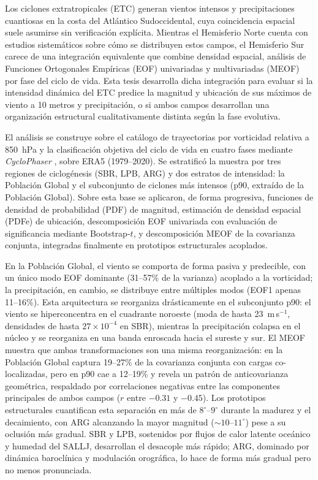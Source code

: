 Los ciclones extratropicales (ETC) generan vientos intensos y precipitaciones cuantiosas en la costa del Atlántico Sudoccidental, cuya coincidencia espacial suele asumirse sin verificación explícita. Mientras el Hemisferio Norte cuenta con estudios sistemáticos sobre cómo se distribuyen estos campos, el Hemisferio Sur carece de una integración equivalente que combine densidad espacial, análisis de Funciones Ortogonales Empíricas (EOF) univariadas y multivariadas (MEOF) por fase del ciclo de vida. Esta tesis desarrolla dicha integración para evaluar si la intensidad dinámica del ETC predice la magnitud y ubicación de sus máximos de viento a 10 metros y precipitación, o si ambos campos desarrollan una organización estructural cualitativamente distinta según la fase evolutiva.

El análisis se construye sobre el catálogo de trayectorias por vorticidad relativa a 850~hPa \citep{gramcianinov2020analysis} y la clasificación objetiva del ciclo de vida en cuatro fases mediante \textit{CycloPhaser} \citep{coutodesouza2024new, deSouza2025CycloPhaser}, sobre ERA5 (1979--2020). Se estratificó la muestra por tres regiones de ciclogénesis (SBR, LPB, ARG) y dos estratos de intensidad: la Población Global y el subconjunto de ciclones más intensos (p90, extraído de la Población Global). Sobre esta base se aplicaron, de forma progresiva, funciones de densidad de probabilidad (PDF) de magnitud, estimación de densidad espacial (PDFe) de ubicación, descomposición EOF univariada con evaluación de significancia mediante Bootstrap-$t$, y descomposición MEOF de la covarianza conjunta, integradas finalmente en prototipos estructurales acoplados.

En la Población Global, el viento se comporta de forma pasiva y predecible, con un único modo EOF dominante (31--57\% de la varianza) acoplado a la vorticidad; la precipitación, en cambio, se distribuye entre múltiples modos (EOF1 apenas 11--16\%). Esta arquitectura se reorganiza drásticamente en el subconjunto p90: el viento se hiperconcentra en el cuadrante noroeste (moda de hasta 23~m\,s$^{-1}$, densidades de hasta $27\times10^{-4}$ en SBR), mientras la precipitación colapsa en el núcleo y se reorganiza en una banda enroscada hacia el sureste y sur. El MEOF muestra que ambas transformaciones son una misma reorganización: en la Población Global captura 19--27\% de la covarianza conjunta con cargas co-localizadas, pero en p90 cae a 12--19\% y revela un patrón de anticovarianza geométrica, respaldado por correlaciones negativas entre las componentes principales de ambos campos ($r$ entre $-0.31$ y $-0.45$). Los prototipos estructurales cuantifican esta separación en más de $8^{\circ}$--$9^{\circ}$ durante la madurez y el decaimiento, con ARG alcanzando la mayor magnitud (${\sim}10$--$11^{\circ}$) pese a su oclusión más gradual. SBR y LPB, sostenidos por flujos de calor latente oceánico y humedad del SALLJ, desarrollan el desacople más rápido; ARG, dominado por dinámica baroclínica y modulación orográfica, lo hace de forma más gradual pero no menos pronunciada.

